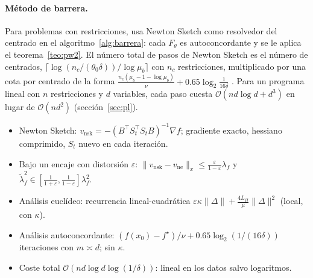 \documentclass[11pt,a4paper,oneside]{book}
\theoremstyle{definition}
\theoremstyle{remark}
\newcommand{\cO}{\mathcal{O}}
\newcommand{\T}{^{\top}}
\newcommand{\eps}{\varepsilon}
\newcommand{\nrm}[1]{\lVert #1\rVert}
\newcommand{\lamf}{\lambda_f}
\newcommand{\lamt}{\widetilde{\lambda}_f}
\newcommand{\vne}{v_{\mathrm{ne}}}
\newcommand{\vnsk}{v_{\mathrm{nsk}}}
\newcommand{\LH}{L_{H}}
\begin{document}
\paragraph{Método de barrera.} Para problemas con restricciones, \cite{PW17} usa Newton Sketch como
resolvedor del centrado en el algoritmo~\ref{alg:barrera}: cada $F_\theta$ es autoconcordante y se le aplica el
teorema~\ref{teo:pw2}. El número total de pasos de Newton Sketch es el número de centrados,
$\lceil\log(n_c/(\theta_0\delta))/\log\mu_b\rceil$ con $n_c$ restricciones, multiplicado por una cota por centrado de la
forma $\frac{n_c(\mu_b-1-\log\mu_b)}{\nu}+0.65\log_2\frac{1}{16\delta}$ \cite[Teorema~4]{PW17}. Para un programa lineal
con $n$ restricciones y $d$ variables, cada paso cuesta $\cO(nd\log d+d^3)$ en lugar de $\cO(nd^2)$
(sección~\ref{sec:pl}).

\begin{resumen}
\begin{itemize}
  \item Newton Sketch: $\vnsk=-(B\T S_t\T S_tB)^{-1}\nabla f$; gradiente exacto, hessiano comprimido, $S_t$ nuevo en cada iteración.
  \item Bajo un encaje con distorsión $\eps$: $\nrm{\vnsk-\vne}_x\le\frac{\eps}{1-\eps}\lamf$ y $\lamt^2\in[\frac{1}{1+\eps},\frac{1}{1-\eps}]\lamf^2$.
  \item Análisis euclídeo: recurrencia lineal-cuadrática $\eps\kappa\nrm{\Delta}+\frac{4\LH}{\mu}\nrm{\Delta}^2$ (local, con $\kappa$).
  \item Análisis autoconcordante: $(f(x_0)-f^\star)/\nu+0.65\log_2(1/(16\delta))$ iteraciones con $m\asymp d$; sin $\kappa$.
  \item Coste total $\cO(nd\log d\log(1/\delta))$: lineal en los datos salvo logaritmos.
\end{itemize}
\end{resumen}
\end{document}
